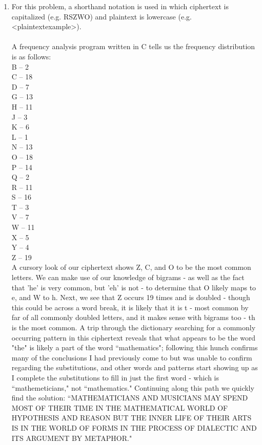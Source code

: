 \documentclass[10pt,letterpaper]{article}
\begin{document}
\pagestyle{fancy}
\rhead{\today}

\begin{enumerate}

    \item
        For this problem, a shorthand notation is used in which ciphertext is capitalized (e.g. RSZWO) and plaintext is lowercase (e.g. <plaintextexample>).\\\\
        A frequency analysis program written in C tells us the frequency distribution is as follows:\\
            B -- 2\\
            C -- 18\\
            D -- 7\\ 
            G -- 13\\
            H -- 11\\
            J -- 3\\
            K -- 6\\
            L -- 1\\
            N -- 13\\
            O -- 18\\
            P -- 14\\
            Q -- 2\\
            R -- 11\\
            S -- 16\\
            T -- 3\\
            V -- 7\\
            W -- 11\\
            X -- 5\\
            Y -- 4\\
            Z -- 19\\
        A cursory look of our ciphertext shows Z, C, and O to be the most common letters.  We can make use of our knowledge of bigrams - as well as the fact that 'he' is very common, but 'eh' is not - to determine that O likely maps to e, and W to h.
        Next, we see that Z occurs 19 times and is doubled - though this could be across a word break, it is likely that it is t - most common by far of all commonly doubled letters, and it makes sense with bigrams too - th is the most common.
        A trip through the dictionary searching for a commonly occurring pattern in this ciphertext reveals that what appears to be the word "the" is likely a part of the word ``mathematics"; 
        following this hunch confirms many of the conclusions I had previously come to but was unable to confirm regarding the substitutions, and other words and patterns start showing up as I complete the substitutions to fill in just the first word - which is ``mathemeticians," not ``mathematics."
        Continuing along this path we quickly find the solution:
        ``MATHEMATICIANS AND MUSICIANS MAY SPEND MOST OF THEIR TIME IN THE MATHEMATICAL WORLD OF HYPOTHESIS AND REASON BUT THE INNER LIFE OF THEIR ARTS IS IN THE WORLD OF FORMS IN THE PROCESS OF DIALECTIC AND ITS ARGUMENT BY METAPHOR."
        



\end{enumerate}
\end{document}
